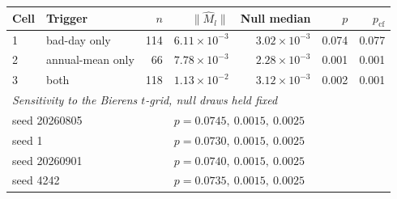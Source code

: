 \begin{tabular}{llrrrrr}
\toprule
Cell & Trigger & $n$ & $\|\hat M_l\|$ & Null median & $p$ & $p_{\mathrm{cf}}$ \\
\midrule
1 & bad-day only & 114 & $6.11 \times 10^{-3}$ & $3.02 \times 10^{-3}$ & 0.074 & 0.077 \\
2 & annual-mean only & 66 & $7.78 \times 10^{-3}$ & $2.28 \times 10^{-3}$ & 0.001 & 0.001 \\
3 & both & 118 & $1.13 \times 10^{-2}$ & $3.12 \times 10^{-3}$ & 0.002 & 0.001 \\
\midrule
\multicolumn{7}{l}{\textit{Sensitivity to the Bierens $t$-grid, null draws held fixed}} \\
\multicolumn{3}{l}{seed 20260805} & \multicolumn{4}{l}{$p = 0.0745,\ 0.0015,\ 0.0025$} \\
\multicolumn{3}{l}{seed 1} & \multicolumn{4}{l}{$p = 0.0730,\ 0.0015,\ 0.0025$} \\
\multicolumn{3}{l}{seed 20260901} & \multicolumn{4}{l}{$p = 0.0740,\ 0.0015,\ 0.0025$} \\
\multicolumn{3}{l}{seed 4242} & \multicolumn{4}{l}{$p = 0.0735,\ 0.0015,\ 0.0025$} \\
\bottomrule
\end{tabular}
